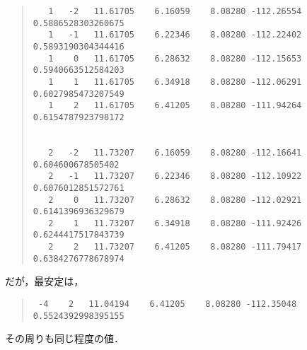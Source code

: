 \begin{quote}
\begin{verbatim}
   1   -2   11.61705    6.16059    8.08280 -112.26554 0.5886528303260675
   1   -1   11.61705    6.22346    8.08280 -112.22402 0.5893190304344416
   1    0   11.61705    6.28632    8.08280 -112.15653 0.5940663512584203
   1    1   11.61705    6.34918    8.08280 -112.06291 0.6027985473207549
   1    2   11.61705    6.41205    8.08280 -111.94264 0.6154787923798172


   2   -2   11.73207    6.16059    8.08280 -112.16641 0.604600678505402
   2   -1   11.73207    6.22346    8.08280 -112.10922 0.6076012851572761
   2    0   11.73207    6.28632    8.08280 -112.02921 0.6141396936329679
   2    1   11.73207    6.34918    8.08280 -111.92426 0.6244417517843739
   2    2   11.73207    6.41205    8.08280 -111.79417 0.6384276778678974
\end{verbatim}\end{quote}
だが，最安定は，
\begin{quote}\begin{verbatim}
 -4    2   11.04194    6.41205    8.08280 -112.35048 0.5524392998395155
\end{verbatim}\end{quote}
その周りも同じ程度の値．

